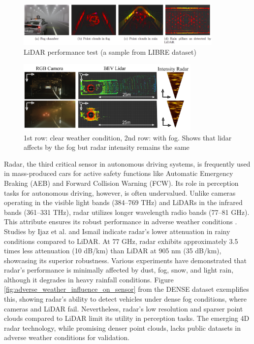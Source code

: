 \documentclass[report.tex]{subfiles}
\begin{document}
    \begin{figure}[h]
        \centering
        \includegraphics[width=0.9\textwidth]{images/lidar_issues.png}
        \caption{LiDAR performance test (a sample from LIBRE \cite{carballo2020libre} dataset)}
        \label{fig:lidar}
    \end{figure}

    \begin{figure}[h]
        \centering
        \includegraphics[width=0.8\textwidth]{images/lidar_in_fog.png}
        \caption{\centering 1st row: clear weather condition, 2nd row: with fog. Shows that lidar affects by the fog but radar intensity remains the same \cite{bijelic2020seeing}}
        \label{fig:lidar_in_fog}
    \end{figure}
    
    Radar, the third critical sensor in autonomous driving systems, is frequently used in mass-produced cars for active safety functions like Automatic Emergency Braking (AEB) and Forward Collision Warning (FCW). Its role in perception tasks for autonomous driving, however, is often undervalued. Unlike cameras operating in the visible light bands (384–769 THz) and LiDARs in the infrared bands (361–331 THz), radar utilizes longer wavelength radio bands (77–81 GHz). This attribute ensures its robust performance in adverse weather conditions \cite{Paek2022Jun}. Studies by Ijaz et al. \cite{ijaz2012analysis} and Ismail \cite{gultepe2008measurements} indicate radar's lower attenuation in rainy conditions compared to LiDAR. At 77 GHz, radar exhibits approximately 3.5 times less attenuation (10 dB/km) than LiDAR at 905 nm (35 dB/km), showcasing its superior robustness. Various experiments \cite{adams2012robotic, brooker2007seeing, xu2022learned, gourova2017analysis, zang2019impact} have demonstrated that radar's performance is minimally affected by dust, fog, snow, and light rain, although it degrades in heavy rainfall conditions. Figure \ref{fig:adverse_weather_influence_on_sensor} from the DENSE \cite{bijelic2020seeing} dataset exemplifies this, showing radar's ability to detect vehicles under dense fog conditions, where cameras and LiDAR fail. Nevertheless, radar's low resolution and sparser point clouds compared to LiDAR limit its utility in perception tasks. The emerging 4D radar technology, while promising denser point clouds, lacks public datasets in adverse weather conditions for validation.
\end{document}

